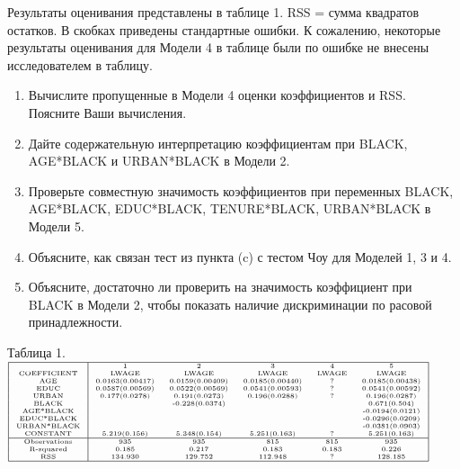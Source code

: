 \documentclass[pdftex,12pt,a4paper]{article}
\begin{document}
\begin{enumerate}
Результаты оценивания представлены в таблице 1. RSS = сумма квадратов остатков. В скобках приведены стандартные ошибки. К сожалению, некоторые результаты оценивания для Модели 4 в таблице были по ошибке не внесены исследователем в таблицу.
\begin{enumerate}
\item Вычислите пропущенные в Модели 4 оценки коэффициентов и RSS. Поясните Ваши вычисления.
\item Дайте содержательную интерпретацию коэффициентам при BLACK, AGE*BLACK и URBAN*BLACK в Модели 2.
\item Проверьте совместную значимость коэффициентов при переменных BLACK, AGE*BLACK, EDUC*BLACK, TENURE*BLACK, URBAN*BLACK в Модели 5.
\item Объясните, как связан тест из пункта (c) с тестом Чоу для Моделей 1, 3 и 4.
\item Объясните, достаточно ли проверить на значимость коэффициент при BLACK в Модели 2, чтобы показать наличие дискриминации по расовой принадлежности.
\end{enumerate}
Таблица 1.\\
$\begin{tiny}
\begin{tabular}{|c|ccccc|}
 \hline
 & 1 & 2 & 3 & 4 & 5\\
 COEFFICIENT & LWAGE & LWAGE & LWAGE & LWAGE & LWAGE\\
 AGE & 0.0163(0.00417) & 0.0159(0.00409) & 0.0185(0.00440) & ? & 0.0185(0.00438)\\
 EDUC & 0.0587(0.00569) & 0.0522(0.00569) & 0.0541(0.00593) & ? & 0.0541(0.00592)\\
 URBAN & 0.177(0.0278) & 0.191(0.0273) & 0.196(0.0288) & ? & 0.196(0.0287)\\
 BLACK & & -0.228(0.0374) & & & 0.671(0.504)\\
 AGE*BLACK & & & & & -0.0194(0.0121)  \\
 EDUC*BLACK & & & & & -0.0296(0.0209)\\
 URBAN*BLACK & & & & & -0.0381(0.0903)\\
 CONSTANT & 5.219(0.156) & 5.348(0.154) & 5.251(0.163) & ? & 5.251(0.163)\\
 \hline
 Observations & 935 & 935 & 815 & 815 & 935\\
 R-squared & 0.185 & 0.217 & 0.183 & 0.183 & 0.226\\
 RSS & 134.930 & 129.752 & 112.948& ? & 128.185\\
 \hline
\end{tabular}
\end{tiny}$
\end{enumerate}
\end{document}
